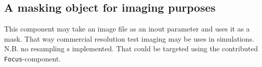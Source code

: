 \subsection*{A masking object for imaging purposes}

This component may take an image file as an inout parameter and uses it as a mask. That way commercial resolution test imaging may be uses in simulations. 
N.B. no resampling s implemented. That could be targeted using the contributed \texttt{Focus}-component.
